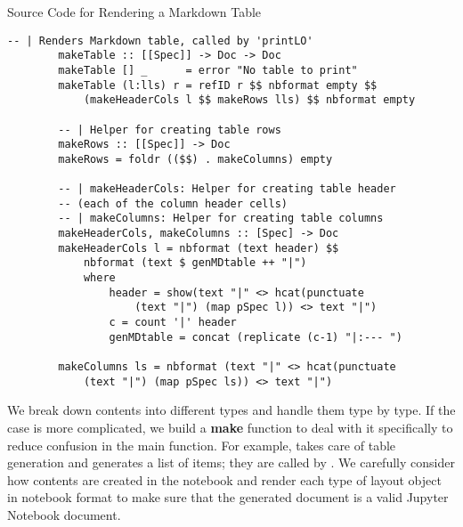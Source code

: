 \begin{listing}[h]
	\caption{Source Code for Rendering a Markdown Table}
	\label{code:makeTable}
	\begin{lstlisting}[language=haskell1]
		-- | Renders Markdown table, called by 'printLO'
		makeTable :: [[Spec]] -> Doc -> Doc
		makeTable [] _      = error "No table to print"
		makeTable (l:lls) r = refID r $$ nbformat empty $$ 
			(makeHeaderCols l $$ makeRows lls) $$ nbformat empty
		
		-- | Helper for creating table rows
		makeRows :: [[Spec]] -> Doc
		makeRows = foldr (($$) . makeColumns) empty
		
		-- | makeHeaderCols: Helper for creating table header
		-- (each of the column header cells)
		-- | makeColumns: Helper for creating table columns
		makeHeaderCols, makeColumns :: [Spec] -> Doc
		makeHeaderCols l = nbformat (text header) $$ 
			nbformat (text $ genMDtable ++ "|")
			where 
				header = show(text "|" <> hcat(punctuate 
					(text "|") (map pSpec l)) <> text "|")        
				c = count '|' header
				genMDtable = concat (replicate (c-1) "|:--- ")
		
		makeColumns ls = nbformat (text "|" <> hcat(punctuate 
			(text "|") (map pSpec ls)) <> text "|")
	\end{lstlisting}
\end{listing}

We break down contents into different types and handle them type by type. If 
the case is more complicated, we build a \textbf{make} function to deal with it 
specifically to reduce confusion in the main  function. For 
example,  takes care of table generation and 
 generates a list of items; they are called by 
. We carefully consider how contents are created in the 
notebook and render each type of layout object in notebook format to make sure 
that the generated document is a valid Jupyter Notebook document.

